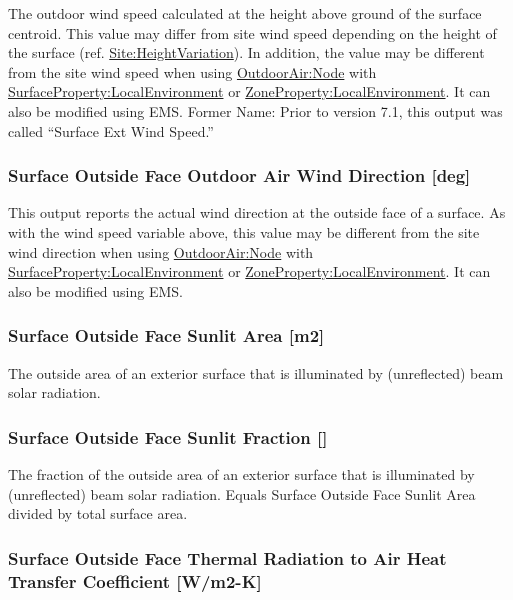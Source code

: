 The outdoor wind speed calculated at the height above ground of the surface centroid. This value may differ from site wind speed depending on the height of the surface (ref. \hyperref[siteheightvariation]{Site:HeightVariation}). In addition, the value may be different from the site wind speed when using \hyperref[outdoorairnode]{OutdoorAir:Node} with  \hyperref[surfacePropertylocalEnvironment]{SurfaceProperty:LocalEnvironment} or \hyperref[ZonePropertylocalEnvironment]{ZoneProperty:LocalEnvironment}. It can also be modified using EMS. Former Name: Prior to version 7.1, this output was called ``Surface Ext Wind Speed.''

\subsubsection{Surface Outside Face Outdoor Air Wind Direction {[}deg{]}}\label{surface-outside-face-outdoor-air-wind-direction-def}

This output reports the actual wind direction at the outside face of a surface.  As with the wind speed variable above, this value may be different from the site wind direction when using \hyperref[outdoorairnode]{OutdoorAir:Node} with \hyperref[surfacePropertylocalEnvironment]{SurfaceProperty:LocalEnvironment} or \hyperref[ZonePropertylocalEnvironment]{ZoneProperty:LocalEnvironment}. It can also be modified using EMS.

\subsubsection{Surface Outside Face Sunlit Area {[}m2{]}}\label{surface-outside-face-sunlit-area-m2}

The outside area of an exterior surface that is illuminated by (unreflected) beam solar radiation.

\subsubsection{Surface Outside Face Sunlit Fraction {[]}}\label{surface-outside-face-sunlit-fraction}

The fraction of the outside area of an exterior surface that is illuminated by (unreflected) beam solar radiation. Equals Surface Outside Face Sunlit Area divided by total surface area.

\subsubsection{Surface Outside Face Thermal Radiation to Air Heat Transfer Coefficient {[}W/m2-K{]}}\label{surface-outside-face-thermal-radiation-to-air-heat-transfer-coefficient-wm2-k}

